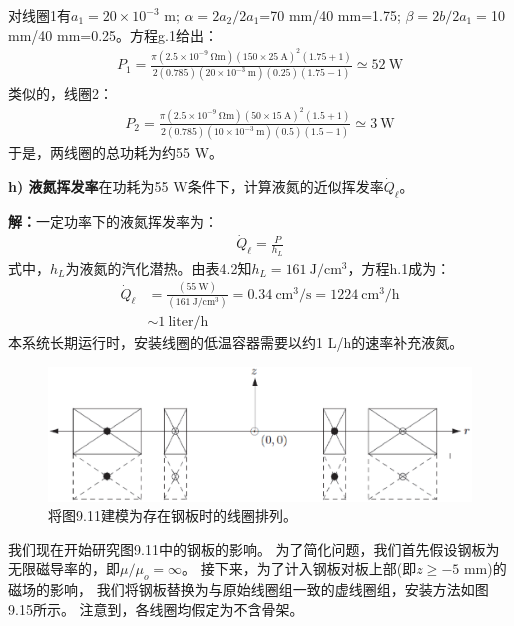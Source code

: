 对线圈1有$a_1=20\times 10^{-3}$ m; $\alpha=2a_2/2a_1$=70 mm/40 mm=1.75;
$\beta=2b/2a_1=$10 mm/40 mm=0.25。方程g.1给出：
\begin{align*}%
P_1=\frac{\pi(2.5\times 10^{-9}\ \mathrm{\Omega m})(150\times 25\ \mathrm{A})^2(1.75+1)}{2(0.785)(20\times 10^{-3}\ \mathrm{m})(0.25)(1.75-1)}\simeq 52\ \mathrm{W}
\end{align*}
类似的，线圈2：
\begin{align*}%
P_2=\frac{\pi(2.5\times 10^{-9}\ \mathrm{\Omega m})(50\times 15\ \mathrm{A})^2(1.5+1)}{2(0.785)(10\times 10^{-3}\ \mathrm{m})(0.5)(1.5-1)}\simeq 3\ \mathrm{W}
\end{align*}
于是，两线圈的总功耗为约55 W。

\textbf{h) 液氮挥发率}\qquad 在功耗为55 W条件下，计算液氮的近似挥发率$\dot{Q}_\ell$。

\textbf{解：}一定功率下的液氮挥发率为：
\begin{align*}%
\dot{Q}_\ell=\frac{P}{h_L} \tag{h.1}
\end{align*}
式中，$h_L$为液氮的汽化潜热。由表4.2知$h_L=161\ \mathrm{J/cm^3}$，方程h.1成为：
\begin{align*}%
\dot{Q}_\ell&=\frac{(55\ \mathrm{W})}{(161\ \mathrm{J/cm^3})}=0.34\ \mathrm{cm^3/s}=1224\ \mathrm{cm^3/h} \\
&\sim 1\ \mathrm{liter/h}
\end{align*}
本系统长期运行时，安装线圈的低温容器需要以约1 L/h的速率补充液氮。

\begin{figure}
	\centering
	\includegraphics[scale=0.5]{chpt9/figs/fig9.15.eps}
	\caption{将图9.11建模为存在钢板时的线圈排列。}
\end{figure}

我们现在开始研究图9.11中的钢板的影响。
为了简化问题，我们首先假设钢板为无限磁导率的，即$\mu/\mu_o=\infty$。
接下来，为了计入钢板对板上部(即$z\ge-5$ mm)的磁场的影响，
我们将钢板替换为与原始线圈组一致的虚线圈组，安装方法如图9.15所示。
注意到，各线圈均假定为不含骨架。

